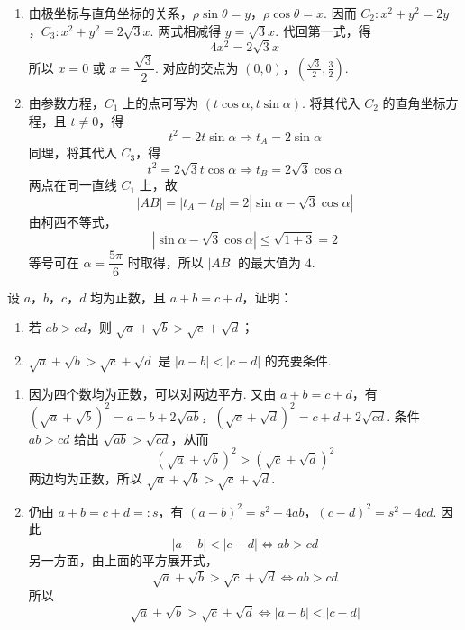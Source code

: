 \begin{solution}
\begin{enumerate}
\item 由极坐标与直角坐标的关系，\(\rho\sin\theta=y\)，\(\rho\cos\theta=x\). 因而
\(C_{2}:x^{2}+y^{2}=2y\)，\(C_{3}:x^{2}+y^{2}=2\sqrt3x\).
两式相减得 \(y=\sqrt3x\). 代回第一式，得
\[
4x^{2}=2\sqrt3x
\]
所以 \(x=0\) 或 \(x=\dfrac{\sqrt3}{2}\). 对应的交点为
\((0,0)\)，\(\left(\frac{\sqrt3}{2},\frac32\right)\).

\item 由参数方程，\(C_{1}\) 上的点可写为 \((t\cos\alpha,t\sin\alpha)\). 将其代入 \(C_{2}\) 的直角坐标方程，且 \(t\ne0\)，得
\[
t^{2}=2t\sin\alpha\Longrightarrow t_{A}=2\sin\alpha
\]
同理，将其代入 \(C_{3}\)，得
\[
t^{2}=2\sqrt3t\cos\alpha\Longrightarrow t_{B}=2\sqrt3\cos\alpha
\]
两点在同一直线 \(C_{1}\) 上，故
\[
|AB|=|t_{A}-t_{B}|=2|\sin\alpha-\sqrt3\cos\alpha|
\]
由柯西不等式，
\[
|\sin\alpha-\sqrt3\cos\alpha|\leqslant\sqrt{1+3}=2
\]
等号可在 \(\alpha=\dfrac{5\pi}{6}\) 时取得，所以 \(|AB|\) 的最大值为 \(4\).
\end{enumerate}
\end{solution}

\begin{problem}
设 \(a\)，\(b\)，\(c\)，\(d\) 均为正数，且 \(a + b = c + d\)，证明：
\begin{enumerate}
\item 若 \(ab > cd\)，则 \(\sqrt{a} + \sqrt{b} > \sqrt{c} + \sqrt{d}\)；
\item \(\sqrt{a} + \sqrt{b} > \sqrt{c} + \sqrt{d}\) 是 \(|a - b| < |c - d|\) 的充要条件.
\end{enumerate}
\end{problem}

\begin{solution}
\begin{enumerate}
\item 因为四个数均为正数，可以对两边平方. 又由 \(a+b=c+d\)，有
\((\sqrt a+\sqrt b)^{2}=a+b+2\sqrt{ab}\)，\((\sqrt c+\sqrt d)^{2}=c+d+2\sqrt{cd}\).
条件 \(ab>cd\) 给出 \(\sqrt{ab}>\sqrt{cd}\)，从而
\[
(\sqrt a+\sqrt b)^{2}>(\sqrt c+\sqrt d)^{2}
\]
两边均为正数，所以 \(\sqrt a+\sqrt b>\sqrt c+\sqrt d\).

\item 仍由 \(a+b=c+d=:s\)，有
\((a-b)^{2}=s^{2}-4ab\)，\((c-d)^{2}=s^{2}-4cd\).
因此
\[
|a-b|<|c-d|\Longleftrightarrow ab>cd
\]
另一方面，由上面的平方展开式，
\[
\sqrt a+\sqrt b>\sqrt c+\sqrt d\Longleftrightarrow ab>cd
\]
所以
\[
\sqrt a+\sqrt b>\sqrt c+\sqrt d
\Longleftrightarrow |a-b|<|c-d|
\]
\end{enumerate}
\end{solution}

